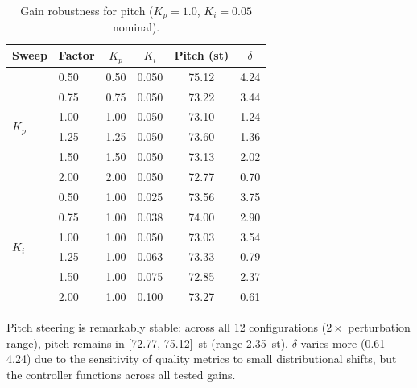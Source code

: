 \documentclass{article}
\theoremstyle{plain}
\begin{document}
\begin{table}[h]
  \caption{Gain robustness for pitch ($K_p{=}1.0$, $K_i{=}0.05$ nominal).}
  \label{tab:gain_pitch}
  \begin{center}
  \begin{small}
  \begin{tabular}{llcccc}
    \toprule
    Sweep & Factor & $K_p$ & $K_i$ & Pitch (st) & $\delta$ \\
    \midrule
    \multirow{6}{*}{$K_p$} & 0.50 & 0.50 & 0.050 & 75.12 & 4.24 \\
    & 0.75 & 0.75 & 0.050 & 73.22 & 3.44 \\
    & 1.00 & 1.00 & 0.050 & 73.10 & 1.24 \\
    & 1.25 & 1.25 & 0.050 & 73.60 & 1.36 \\
    & 1.50 & 1.50 & 0.050 & 73.13 & 2.02 \\
    & 2.00 & 2.00 & 0.050 & 72.77 & 0.70 \\
    \midrule
    \multirow{6}{*}{$K_i$} & 0.50 & 1.00 & 0.025 & 73.56 & 3.75 \\
    & 0.75 & 1.00 & 0.038 & 74.00 & 2.90 \\
    & 1.00 & 1.00 & 0.050 & 73.03 & 3.54 \\
    & 1.25 & 1.00 & 0.063 & 73.33 & 0.79 \\
    & 1.50 & 1.00 & 0.075 & 72.85 & 2.37 \\
    & 2.00 & 1.00 & 0.100 & 73.27 & 0.61 \\
    \bottomrule
  \end{tabular}
  \end{small}
  \end{center}
\end{table}

Pitch steering is remarkably stable: across all 12 configurations ($2{\times}$ perturbation range), pitch remains in [72.77, 75.12]~st (range 2.35~st). $\delta$ varies more (0.61--4.24) due to the sensitivity of quality metrics to small distributional shifts, but the controller functions across all tested gains.
\end{document}
